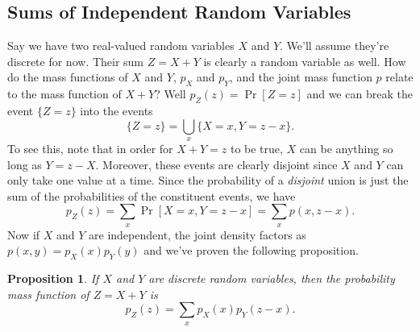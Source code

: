 \documentclass[12pt]{article}
\theoremstyle{plain}
\newtheorem{proposition}[theorem]{Proposition}
\theoremstyle{definition}
\theoremstyle{remark}
\begin{document}
\subsection{Sums of Independent Random Variables}
Say we have two real-valued random variables $X$ and $Y$.
We'll assume they're discrete for now.
Their sum $Z=X+Y$ is clearly a random variable as well.
How do the mass functions of $X$ and $Y$, $p_X$ and $p_Y$, and the joint mass function $p$ relate to the mass function of $X+Y$?
Well $p_Z(z) = \Pr[Z = z]$ and we can break the event $\{Z = z\}$ into the events
\[
    \{Z = z\} = \bigcup_{x}\{X = x, Y = z-x\}.
\]
To see this, note that in order for $X+Y = z$ to be true, $X$ can be anything so long as $Y = z-X$.
Moreover, these events are clearly disjoint since $X$ and $Y$ can only take one value at a time.
Since the probability of a \emph{disjoint} union is just the sum of the probabilities of the constituent events, we have
\[
    p_Z(z) = \sum_x \Pr[X = x, Y= z-x] = \sum_x p(x, z-x).
\]
Now if $X$ and $Y$ are independent, the joint density factors as $p(x,y) = p_X(x)p_Y(y)$ and we've proven the following proposition.
\begin{proposition}
    If $X$ and $Y$ are discrete random variables, then the probability mass function of $Z = X+Y$ is
    \[
        p_Z(z) = \sum_x p_X(x)p_Y(z-x).
    \]
\end{proposition}
\end{document}
